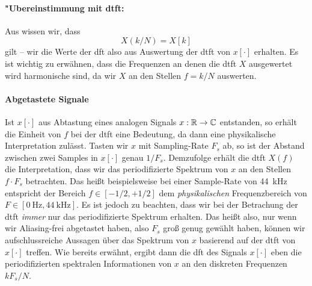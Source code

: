 \paragraph{"Ubereinstimmung mit \gls{dtft}:} Aus  wissen wir, dass
\[
X(k/N) = X[k]
\]
gilt -- wir die Werte der \gls{dft} also aus Auswertung der \gls{dtft} von $x[\cdot]$ erhalten.
Es ist wichtig zu erwähnen, dass die Frequenzen an denen die \gls{dtft} $X$ ausgewertet wird harmonische  sind, da wir $X$ an den Stellen $f = k/N$ auswerten.
%
%
\paragraph{Abgetastete Signale}\label{par:fourier:sampled_sig}
%
Ist $x[\cdot]$ aus Abtastung eines analogen Signals $x: \mathbb{R} \rightarrow \mathbb{C}$ entstanden, so erhält die Einheit von $f$ bei der \gls{dtft} eine Bedeutung, da dann  eine physikalische Interpretation zulässt.
Tasten wir $x$ mit Sampling-Rate $F_s$ ab, so ist der Abstand zwischen zwei Samples in $x[\cdot]$ genau $1/F_s$.
Demzufolge erhält die \gls{dtft} $X(f)$ die Interpretation, dass wir das periodifizierte Spektrum von $x$ an den Stellen $f \cdot F_s$ betrachten.
Das heißt beispielsweise bei einer Sample-Rate von \SI{44}{\kilo\hertz} entspricht der Bereich $f \in [-1/2,+1/2]$ dem \emph{physikalischen} Frequenzbereich von $F \in [\SI{0}{\hertz},\SI{44}{\kilo\hertz}]$.
Es ist jedoch zu beachten, dass wir bei der Betrachung der \gls{dtft} \emph{immer} nur das periodifizierte Spektrum erhalten. 
Das heißt also, nur wenn wir Aliasing-frei abgetastet haben, also $F_s$ groß genug gewählt haben, können wir aufschlussreiche Aussagen über das Spektrum von $x$ basierend auf der \gls{dtft} von $x[\cdot]$ treffen.
Wie bereits erwähnt, ergibt dann die \gls{dft} des Signals $x[\cdot]$ eben die periodifizierten spektralen Informationen von $x$ an den diskreten Frequenzen $k F_s/N$.
%
%
